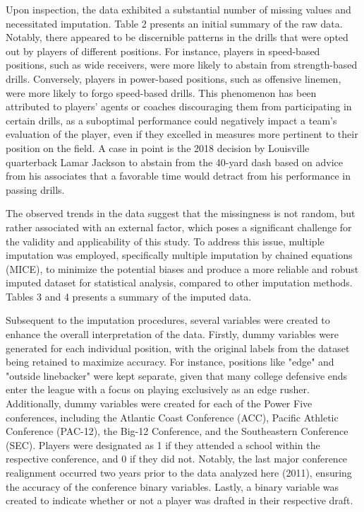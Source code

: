 \documentclass[12pt,english]{article}
\begin{document}
Upon inspection, the data exhibited a substantial number of missing values and necessitated imputation. Table 2 presents an initial summary of the raw data. Notably, there appeared to be discernible patterns in the drills that were opted out by players of different positions. For instance, players in speed-based positions, such as wide receivers, were more likely to abstain from strength-based drills. Conversely, players in power-based positions, such as offensive linemen, were more likely to forgo speed-based drills. This phenomenon has been attributed to players' agents or coaches discouraging them from participating in certain drills, as a suboptimal performance could negatively impact a team's evaluation of the player, even if they excelled in measures more pertinent to their position on the field. A case in point is the 2018 decision by Louisville quarterback Lamar Jackson to abstain from the 40-yard dash based on advice from his associates that a favorable time would detract from his performance in passing drills. 

The observed trends in the data suggest that the missingness is not random, but rather associated with an external factor, which poses a significant challenge for the validity and applicability of this study. To address this issue, multiple imputation was employed, specifically multiple imputation by chained equations (MICE), to minimize the potential biases and produce a more reliable and robust imputed dataset for statistical analysis, compared to other imputation methods. Tables 3 and 4 presents a summary of the imputed data. 

Subsequent to the imputation procedures, several variables were created to enhance the overall interpretation of the data. Firstly, dummy variables were generated for each individual position, with the original labels from the dataset being retained to maximize accuracy. For instance, positions like "edge" and "outside linebacker" were kept separate, given that many college defensive ends enter the league with a focus on playing exclusively as an edge rusher. Additionally, dummy variables were created for each of the Power Five conferences, including the Atlantic Coast Conference (ACC), Pacific Athletic Conference (PAC-12), the Big-12 Conference, and the Southeastern Conference (SEC). Players were designated as 1 if they attended a school within the respective conference, and 0 if they did not. Notably, the last major conference realignment occurred two years prior to the data analyzed here (2011), ensuring the accuracy of the conference binary variables. Lastly, a binary variable was created to indicate whether or not a player was drafted in their respective draft.
\end{document}
